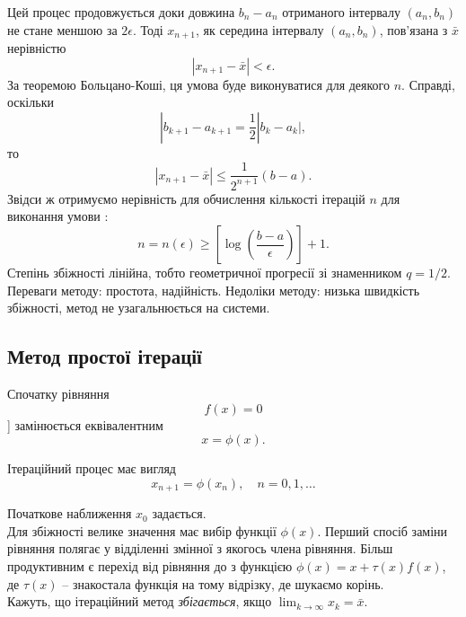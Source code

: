 	Цей процес продовжується доки довжина $b_n-a_n$ отриманого інтервалу $(a_n,b_n)$ не стане меншою за $2\epsilon$. Тоді $x_{n+1}$, як середина інтервалу $(a_n,b_n)$, пов'язана з $\bar x$ нерівністю \begin{equation} \label{eq:xn-xbar} |x_{n+1}-\bar x|<\epsilon. \end{equation} За теоремою Больцано-Коші, ця умова буде виконуватися для деякого $n$. Справді, оскільки \[|b_{k+1}-a_{k+1}=\dfrac12|b_k-a_k|,\] то \begin{equation} \label{eq:xn-xbar 2} |x_{n+1}-\bar x|\le \dfrac1{2^{n+1}}(b-a).\end{equation} Звідси ж отримуємо нерівність для обчислення кількості ітерацій $n$ для виконання умови : \[n=n(\epsilon)\ge \left[\log\left(\dfrac{b-a}{\epsilon}\right)\right] + 1.\] Степінь збіжності лінійна, тобто геометричної прогресії зі знаменником $q=1/2$.\\
	
	Переваги методу: простота, надійність. Недоліки методу: низька швидкість збіжності, метод не узагальнюється на системи.
	
	\subsection{Метод простої ітерації}
	
	Спочатку рівняння \begin{equation} \label{eq:f(x)=0 2} f(x) = 0 \end{equation}] замінюється еквівалентним \begin{equation} \label{eq:x=phi(x)} x=\phi(x). \end{equation} 
	
	Ітераційний процес має вигляд \begin{equation} \label{eq:xn=phi(xn)} x_{n+1}=\phi(x_n), \quad n=0,1,\ldots \end{equation} 
	
	Початкове наближення $x_0$ задається. \\
	
	Для збіжності велике значення має вибір функції $\phi(x)$. Перший спосіб заміни рівняння полягає у відділенні змінної з якогось члена рівняння. Більш продуктивним є перехід від рівняння  до  з функцією $\phi(x)=x+\tau(x)f(x)$, де $\tau(x)$ -- знакостала функція на тому відрізку, де шукаємо корінь.\\
	
	Кажуть, що ітераційний метод \textit{збігається}, якщо $\lim_{k\to\infty} x_k=\bar x$.\\
	
